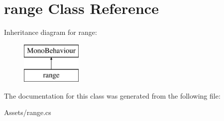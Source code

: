 \hypertarget{classrange}{}\section{range Class Reference}
\label{classrange}
Inheritance diagram for range\+:\begin{figure}[H]
\begin{center}
\leavevmode
\includegraphics[height=2.000000cm]{classrange}
\end{center}
\end{figure}


The documentation for this class was generated from the following file\+:\begin{DoxyCompactItemize}
\item 
Assets/range.\+cs\end{DoxyCompactItemize}
